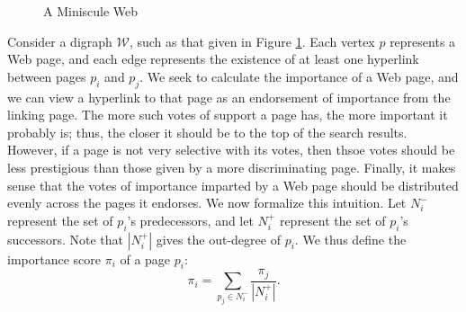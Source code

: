 \documentclass[../exploring-pagerank.tex]{subfiles}
\begin{document}
	\begin{figure}[h]
		\centering {}
		\caption{A Miniscule Web}
		\label{fig:web}
	\end{figure}
	Consider a digraph $\mathcal{W}$, such as that given in Figure \ref{fig:web}. Each vertex $p$ represents a Web page, and each edge represents the existence of at least one hyperlink between pages $p_i$ and $p_j$. We seek to calculate the importance of a Web page, and we can view a hyperlink to that page as an endorsement of importance from the linking page. The more such votes of support a page has, the more important it probably is; thus, the closer it should be to the top of the search results. However, if a page is not very selective with its votes, then thsoe votes should be less prestigious than those given by a more discriminating page. Finally, it makes sense that the votes of importance imparted by a Web page should be distributed evenly across the pages it endorses. We now formalize this intuition. Let $N^-_i$ represent the set of $p_i$'s predecessors, and let $N^+_i$ represent the set of $p_i$'s successors. Note that $|N^+_i|$ gives the out-degree of $p_i$. We thus define the importance score $\pi_i$ of a page $p_i$:
 	\begin{equation}\label{eqn:pi_i}
 		\pi_i = \sum_{p_j\in N^-_i}{\frac{\pi_j}{|N^+_i|}}.
 	\end{equation}
\end{document}
